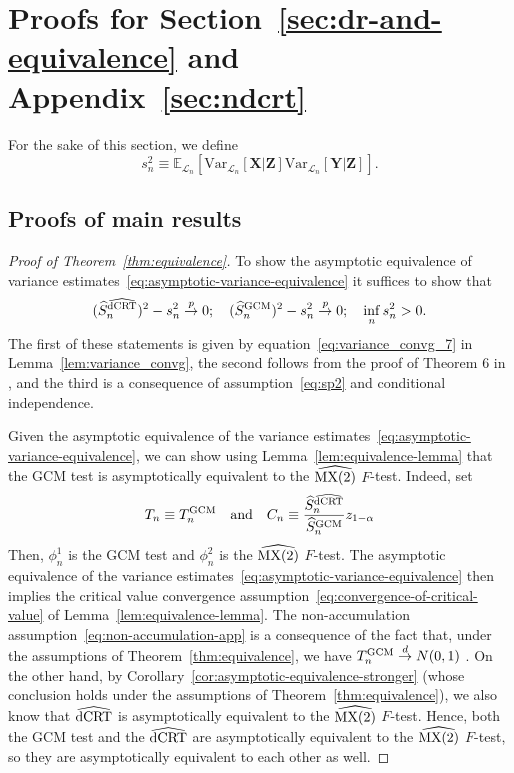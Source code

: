 \documentclass[12pt]{article}
\makeatletter
\theoremstyle{definition}
\theoremstyle{remark}
\newcommand\newtarget[2]{\Hy@raisedlink{\hypertarget{#1}{}}#2}
\newcommand{\E}{\mathbb E}								%
\newcommand{\V}{\mathrm{Var}}							%
\newcommand{\convp}{\overset p \rightarrow}             %
\newcommand{\convd}{\overset d \rightarrow}             %
\newcommand{\prx}{\bm X}								%
\newcommand{\prz}{\bm Z}								%
\newcommand{\pry}{{\bm Y}}								%
\newcommand{\law}{\mathcal L}							%
\newcommand{\GCM}{\textnormal{GCM}}						%
\newcommand{\dCRThat}{\widehat{\textnormal{dCRT}}}		%
\newcommand{\MXtwohat}{\widehat{\textnormal{MX(2)}}}		%
\makeatother
\begin{document}
\section{Proofs for Section~\ref{sec:dr-and-equivalence} and Appendix~\ref{sec:ndcrt}}

For the sake of this section, we define
\begin{equation}
	s^2_n \equiv \E_{\law_n}[\V_{\law_n}[\prx|\prz]\V_{\law_n}[\pry|\prz]]. 
\end{equation}

\subsection{Proofs of main results}

\begin{proof}[Proof of Theorem~\ref{thm:equivalence}]\newtarget{proof:thm:equivalence}{}

To show the asymptotic equivalence of variance estimates~\eqref{eq:asymptotic-variance-equivalence} it suffices to show that
\begin{equation}
(\widehat S_n^{\dCRThat})^2 - s^2_n \convp 0; \quad (\widehat S_n^{\GCM})^2 - s^2_n \convp 0; \quad \inf_{n} s^2_n > 0.
\end{equation}
The first of these statements is given by equation~\eqref{eq:variance_convg_7} in Lemma~\ref{lem:variance_convg}, the second follows from the proof of Theorem 6 in \citet{Shah2018}, and the third is a consequence of assumption~\eqref{eq:sp2} and conditional independence.
  
Given the asymptotic equivalence of the variance estimates~\eqref{eq:asymptotic-variance-equivalence}, we can show using Lemma~\ref{lem:equivalence-lemma} that the GCM test is asymptotically equivalent to the $\MXtwohat$ $F$-test. Indeed, set
\begin{equation}
	T_n \equiv T_n^\GCM \quad \text{and} \quad C_n \equiv \frac{\widehat S_n^{\dCRThat}}{\widehat S_{n}^{\GCM}}z_{1-\alpha}
\end{equation}
Then, $\phi_n^1$ is the GCM test and $\phi_n^2$ is the $\MXtwohat$ $F$-test. The asymptotic equivalence of the variance estimates~\eqref{eq:asymptotic-variance-equivalence} then implies the critical value convergence assumption~\eqref{eq:convergence-of-critical-value} of Lemma~\ref{lem:equivalence-lemma}. The non-accumulation assumption~\eqref{eq:non-accumulation-app} is a consequence of the fact that, under the assumptions of Theorem~\ref{thm:equivalence}, we have $T^{\text{\GCM}}_n \convd N(0,1)$ \citep{Shah2018}. On the other hand, by Corollary~\ref{cor:asymptotic-equivalence-stronger} (whose conclusion holds under the assumptions of Theorem~\ref{thm:equivalence}), we also know that $\dCRThat$ is asymptotically equivalent to the $\MXtwohat$ $F$-test. Hence, both the GCM test and the $\dCRThat$ are asymptotically equivalent to the $\MXtwohat$ $F$-test, so they are asymptotically equivalent to each other as well.
\end{proof}
\end{document}
